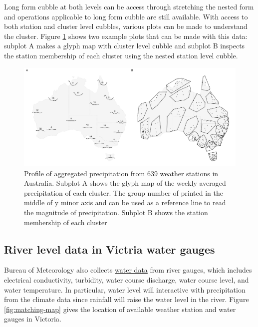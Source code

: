 \documentclass[
]{jss}
\begin{document}
Long form cubble at both levels can be access through stretching the
nested form and operations applicable to long form cubble are still
available. With access to both station and cluster level cubbles,
various plots can be made to understand the cluster. Figure
\ref{fig:basic-agg} shows two example plots that can be made with this
data: subplot A makes a glyph map with cluster level cubble and subplot
B inspects the station membership of each cluster using the nested
station level cubble.

\begin{CodeChunk}
\begin{figure}

{\centering \includegraphics[width=1\linewidth]{figures/basic-agg} 

}

\caption[Profile of aggregated precipitation from 639 weather stations in Australia]{Profile of aggregated precipitation from 639 weather stations in Australia. Subplot A shows the glyph map of the weekly averaged precipitation of each cluster. The group number of printed in the middle of y minor axis and can be used as a reference line to read the magnitude of precipitation. Subplot B shows the station membership of each cluster}\label{fig:basic-agg}
\end{figure}
\end{CodeChunk}

\hypertarget{river-level-data-in-victria-water-gauges}{%
\subsection{River level data in Victria water
gauges}\label{river-level-data-in-victria-water-gauges}}

Bureau of Meteorology also collects
\href{http://www.bom.gov.au/metadata/catalogue/19115/ANZCW0503900528?template=full}{water
data} from river gauges, which includes electrical conductivity,
turbidity, water course discharge, water course level, and water
temperature. In particular, water level will interactive with
precipitation from the climate data since rainfall will raise the water
level in the river. Figure \ref{fig:matching-map} gives the location of
available weather station and water gauges in Victoria.
\end{document}
